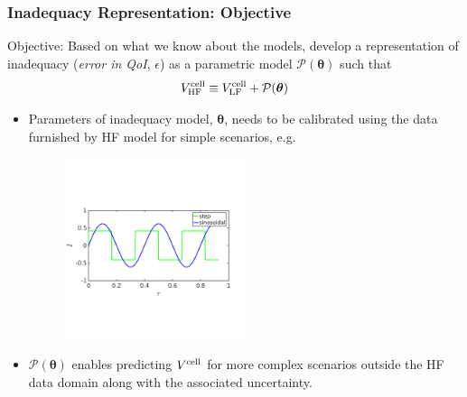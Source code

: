 \documentclass[10pt,xcolor=dvipsnames,compress]{beamer}
\begin{document}
\begin{frame}
\frametitle{Inadequacy Representation: Objective}
\vfill


\begin{alertblock}{Objective:}
Based on what we know about the models, develop a representation of inadequacy (\textit{error in QoI}, $\epsilon$) as a parametric model $\mathcal{P}(\boldsymbol{\theta})$ such that 
\begin{equation*}
V^{\rm cell}_{\rm HF} \equiv  V^{\rm cell}_{\rm LF} + \mathcal{P}(\boldsymbol{\theta})
\end{equation*}
\end{alertblock}


\begin{itemize}

\item Parameters of inadequacy model, $\boldsymbol{\theta}$, needs to be calibrated using the data furnished by HF model for simple scenarios, e.g. 

\begin{figure}[h]
    \centering
    \includegraphics[trim = 0.in 2.4in 0.8in 2.8in, clip, width=0.5\textwidth]{figs/I_scenario.png} 
\end{figure}

\vspace{-0.1in}

\item $\mathcal{P}(\boldsymbol{\theta})$ enables predicting $V^{\rm cell}$ for more complex scenarios outside the HF data domain along with the associated uncertainty.

\end{itemize}


\vfill
\end{frame}
\end{document}
